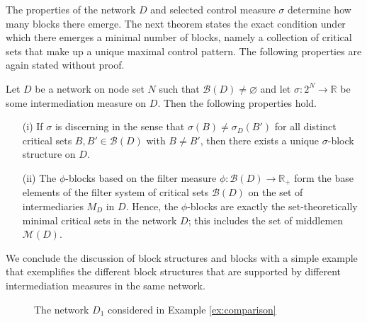 The properties of the network $D$ and selected control measure $\sigma$ determine how many blocks there emerge. The next theorem states the exact condition under which there emerges a minimal number of blocks, namely a collection of critical sets that make up a unique maximal control pattern. The following properties are again stated without proof.
\begin{property}
Let $D$ be a network on node set $N$ such that $\mathcal{B} (D) \neq \varnothing$ and let $\sigma \colon 2^N \to \mathbb{R}$ be some intermediation measure on $D$. Then the following properties hold.
\begin{itemize}
\item[(i)] If $\sigma$ is discerning in the sense that $\sigma (B) \neq \sigma_D (B')$ for all distinct critical sets $B,B' \in \mathcal{B} (D)$ with $B \neq B'$, then there exists a unique $\sigma$-block structure on $D$.

\item[(ii)] The $\phi$-blocks based on the filter measure $\phi \colon \mathcal{B} (D) \to \mathbb{R}_+$ form the base elements of the filter system of critical sets $\mathcal{B} (D)$ on the set of intermediaries $M_D$ in $D$. Hence, the $\phi$-blocks are exactly the set-theoretically minimal critical sets in the network $D$; this includes the set of middlemen $\mathcal{M} (D)$.
\end{itemize}
\end{property}
We conclude the discussion of block structures and blocks with a simple example that exemplifies the different block structures that are supported by different intermediation measures in the same network.

\begin{figure}[h]
\begin{center}
\end{center}
\caption{The network $D_1$ considered in Example \ref{ex:comparison}}
\label{Fig2}
\end{figure}

